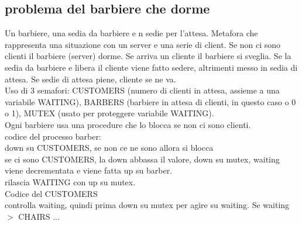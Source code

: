 \documentclass{article}
\begin{document}
\subsection{problema del barbiere che dorme}
Un barbiere, una sedia da barbiere e n sedie per l'attesa. Metafora che rappresenta una 
situazione con un server e una serie di client. Se non ci sono clienti il barbiere (server) dorme. 
Se arriva un cliente il barbiere si sveglia. Se la sedia da barbiere e libera 
il cliente viene fatto sedere, altrimenti messo in sedia di attesa. Se sedie di attesa piene, cliente se ne va.\\
Uso di 3 semafori: CUSTOMERS (numero di clienti in attesa, assieme a una variabile WAITING), BARBERS (barbiere in attesa di clienti, in questo caso o 0 o 1), 
MUTEX (usato per proteggere variabile WAITING).\\
Ogni barbiere usa una procedure che lo blocca se non ci sono clienti.
\\
codice del processo barber:\\
down su CUSTOMERS, se non ce ne sono allora si blocca\\
se ci sono CUSTOMERS, la down abbassa il valore, down su mutex, 
waiting viene decrementata e viene fatta up su barber.\\
rilascia WAITING con up su mutex.
\\
Codice del CUSTOMERS\\
controlla waiting, quindi prima down su mutex per agire su waiting. Se waiting $>$ CHAIRS ...
\end{document}
